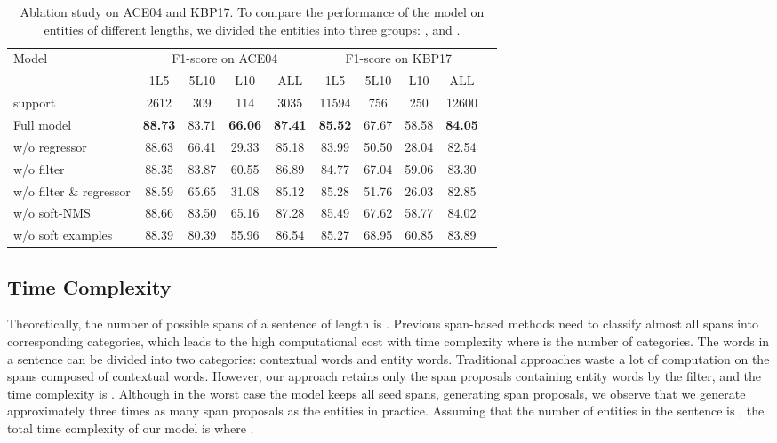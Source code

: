 \documentclass[11pt,a4paper]{article}
\begin{document}
\begin{table*}[h]
\centering
\small
\begin{tabular}{lccccccccc}
\toprule
\multirow{2}{*}{Model}   & \multicolumn{4}{c}{F1-score on ACE04}  & \multicolumn{4}{c}{F1-score on KBP17}  \\
 \cmidrule(lr){2-5}  \cmidrule(lr){6-9}  
& 1L5  & 5L10 & L10 & ALL & 1L5  & 5L10 & L10 & ALL  \\
\midrule
support & 2612 & 309 & 114 & 3035 & 11594 & 756 & 250 & 12600\\
\midrule
Full model   & \textbf{88.73} & 83.71 & \textbf{66.06} & \textbf{87.41} & \textbf{85.52} & 67.67 & 58.58 & \textbf{84.05}\\
\quad w/o regressor  & 88.63 & 66.41 & 29.33 & 85.18
& 83.99 & 50.50 & 28.04 & 82.54 \\

\quad w/o filter & 88.35 & 83.87 & 60.55 & 86.89
&   84.77 & 67.04 & 59.06 & 83.30\\ 


\quad w/o filter \& regressor & 88.59 & 65.65 & 31.08 & 85.12 
& 85.28 &51.76 &26.03 & 82.85 \\ 
\quad w/o soft-NMS & 88.66 & 83.50 & 65.16 & 87.28 & 85.49 & 67.62 & 58.77 & 84.02\\
\quad w/o soft examples  & 88.39 & 80.39 & 55.96 & 86.54
& 85.27 & 68.95 &60.85 &83.89\\ 
\bottomrule
\end{tabular}
\caption{Ablation study on ACE04 and KBP17. To compare the performance of the model on entities of different lengths, we divided the entities into three groups: ,  and .}
\label{tab:ablation}
\end{table*}





\subsection{Time Complexity}

Theoretically, the number of possible spans of a sentence of length  is . Previous span-based methods need to classify almost all spans into corresponding categories, which leads to the high computational cost with  time complexity where  is the number of categories. 
The words in a sentence can be divided into two categories: contextual words and entity words.
Traditional approaches waste a lot of computation on the spans composed of contextual words. However, our approach retains only the span proposals containing entity words by the filter, and the time complexity is . Although in the worst case the model keeps all seed spans, generating  span proposals, we observe that we generate approximately three times as many span proposals as the entities in practice. Assuming that the number of entities in the sentence is , the total time complexity of our model is  where .
\end{document}
